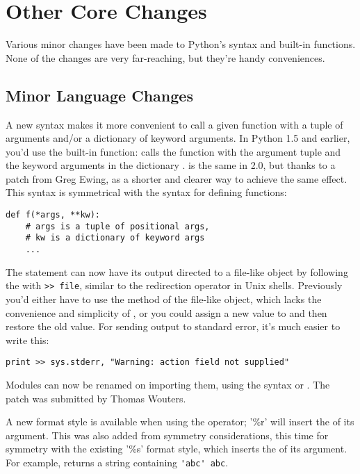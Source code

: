 \documentclass{howto}
\begin{document}
\section{Other Core Changes}

Various minor changes have been made to Python's syntax and built-in
functions.  None of the changes are very far-reaching, but they're
handy conveniences.

\subsection{Minor Language Changes}

A new syntax makes it more convenient to call a given function
with a tuple of arguments and/or a dictionary of keyword arguments.
In Python 1.5 and earlier, you'd use the 
built-in function:  calls the
function  with the argument tuple  and the
keyword arguments in the dictionary .   
is the same in 2.0, but thanks to a patch from
Greg Ewing,  as a shorter
and clearer way to achieve the same effect.  This syntax is
symmetrical with the syntax for defining functions:

\begin{verbatim}
def f(*args, **kw):
    # args is a tuple of positional args,
    # kw is a dictionary of keyword args
    ...
\end{verbatim}

The  statement can now have its output directed to a
file-like object by following the  with 
\verb|>> file|, similar to the redirection operator in Unix shells.
Previously you'd either have to use the  method of the
file-like object, which lacks the convenience and simplicity of
, or you could assign a new value to 
 and then restore the old value.  For sending output to standard error,
it's much easier to write this:

\begin{verbatim}
print >> sys.stderr, "Warning: action field not supplied"
\end{verbatim}

Modules can now be renamed on importing them, using the syntax
 or .  The patch was submitted by
Thomas Wouters.

A new format style is available when using the \code{\%} operator;
'\%r' will insert the  of its argument.  This was
also added from symmetry considerations, this time for symmetry with
the existing '\%s' format style, which inserts the  of
its argument.  For example,  returns a
string containing \verb|'abc' abc|.
\end{document}
